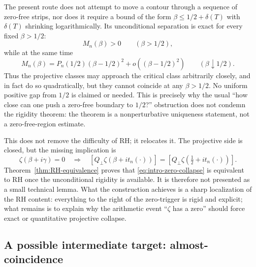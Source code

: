 \documentclass[11pt]{amsart}
\numberwithin{equation}{section}
\begin{document}
The present route does not attempt to move a contour through a sequence of
zero-free strips, nor does it require a bound of the form
$\beta\leq1/2+\delta(T)$ with $\delta(T)$ shrinking logarithmically.  Its
unconditional separation is exact for every fixed $\beta>1/2$:
\begin{equation}
 M_n(\beta)>0
 \qquad(\beta>1/2),
 \label{eq:intro-exact-separation-all-beta}
\end{equation}
while at the same time
\begin{equation}
 M_n(\beta)
 =P_n(1/2)(\beta-1/2)^2
 +o\!\left((\beta-1/2)^2\right)
 \qquad(\beta\downarrow1/2).
 \label{eq:intro-quadratic-approach}
\end{equation}
Thus the projective classes may approach the critical class arbitrarily
closely, and in fact do so quadratically, but they cannot coincide at any
$\beta>1/2$.  No uniform positive gap from $1/2$ is claimed or needed.  This
is precisely why the usual ``how close can one push a zero-free boundary to
$1/2$?'' obstruction does not condemn the rigidity theorem: the theorem is a
nonperturbative uniqueness statement, not a zero-free-region estimate.

This does not remove the difficulty of RH; it relocates it.  The projective
side is closed, but the missing implication is
\begin{equation}
 \zeta(\beta+i\gamma)=0
 \quad\Longrightarrow\quad
 [Q_\perp\zeta(\beta+i t_n(\cdot))]
 =
 [Q_\perp\zeta(\tfrac12+i t_n(\cdot))].
 \label{eq:intro-zero-collapse}
\end{equation}
Theorem~\ref{thm:RH-equivalence} proves that
\eqref{eq:intro-zero-collapse} is equivalent to RH once the unconditional
rigidity is available.  It is therefore not presented as a small technical
lemma.  What the construction achieves is a sharp localization of the RH
content: everything to the right of the zero-trigger is rigid and explicit;
what remains is to explain why the arithmetic event ``$\zeta$ has a zero''
should force exact or quantitative projective collapse.

\subsection{A possible intermediate target: almost-coincidence}
\label{subsec:intro-almost-collapse}
\end{document}
